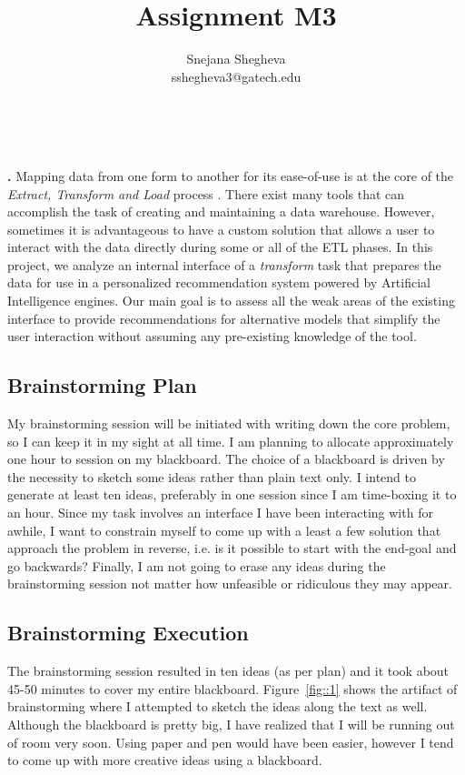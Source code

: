 \documentclass[12pt,letterpaper]{article}
\makeatletter
\renewcommand{\maketitle}{\bgroup
   \begin{center}
   \textbf{{\fontsize{18pt}{20}\selectfont \@title}}\\
   \vspace{10pt}
   {\fontsize{12pt}{0}\selectfont \@author} 
   \end{center}
}
\newenvironment{myquote}[1]%
  {\list{}{\leftmargin=#1\rightmargin=#1}\item[]}%
  {\endlist}
\renewenvironment{abstract}
{\vspace*{-.5in}\fontsize{12pt}{12}\begin{myquote}{.5in}
\noindent \par{\bfseries \abstractname.}}
{\medskip\noindent
\end{myquote}
}
\makeatother
\begin{document}
\title{Assignment M3}
\author{Snejana Shegheva \\ sshegheva3@gatech.edu}

\maketitle
\thispagestyle{fancy}

\begin{abstract}
Mapping data from one form to another for its ease-of-use is at the core of the \textit{Extract, Transform and Load} process \cite{wiki:etl}. There exist many tools that can accomplish the task of creating and maintaining a data warehouse. However, sometimes it is advantageous to have a custom solution that allows a user to interact with the data directly during some or all of the ETL phases. In this project, we analyze an internal interface of a \textit{transform} task that prepares the data for use in a personalized recommendation system powered by Artificial Intelligence engines. Our main goal is to assess all the weak areas of the existing interface to provide recommendations for alternative models that simplify the user interaction without assuming any pre-existing knowledge of the tool.
\end{abstract}

\subsection*{Brainstorming Plan}
My brainstorming session will be initiated with writing down the core problem, so I can keep it in my sight at all time. I am planning to allocate approximately one hour to session on my blackboard. The choice of a blackboard is driven by the necessity to sketch some ideas rather than plain text only. I intend to generate at least ten ideas, preferably in one session since I am time-boxing it to an hour. Since my task involves an interface I have been interacting with for awhile, I want to constrain myself to come up with a least a few solution that approach the problem in reverse, i.e. is it possible to start with the end-goal and go backwards? Finally, I am not going to erase any ideas during the brainstorming session not matter how unfeasible or ridiculous they may appear. 

\subsection*{Brainstorming Execution}
The brainstorming session resulted in ten ideas (as per plan) and it took about 45-50 minutes to cover my entire blackboard. Figure~\ref{fig::1} shows the artifact of brainstorming where I attempted to sketch the ideas along the text as well. Although the blackboard is pretty big, I have realized that I will be running out of room very soon. Using paper and pen would have been easier, however I tend to come up with more creative ideas using a blackboard.
\end{document}
